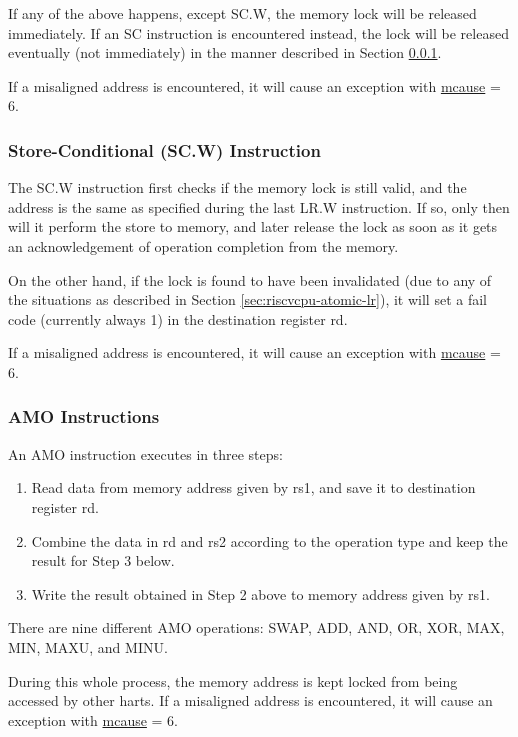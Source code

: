 \documentclass[main\_\_EN.tex]{subfiles}
\begin{document}
If any of the above happens, except SC.W, the memory lock will be released immediately. If an SC instruction is encountered instead, the lock will be released eventually (not immediately) in the manner described in Section \ref{sec:riscvcpu-atomic-sc}.

If a misaligned address is encountered, it will cause an exception with \hyperref[regdesc:MCAUSE]{mcause} = 6.

\subsubsection{Store-Conditional (SC.W) Instruction}
\label{sec:riscvcpu-atomic-sc}

The SC.W instruction first checks if the memory lock is still valid, and the address is the same as specified during the last LR.W instruction. If so, only then will it perform the store to memory, and later release the lock as soon as it gets an acknowledgement of operation completion from the memory.

On the other hand, if the lock is found to have been invalidated (due to any of the situations as described in Section \ref{sec:riscvcpu-atomic-lr}), it will set a fail code (currently always 1) in the destination register rd.

If a misaligned address is encountered, it will cause an exception with \hyperref[regdesc:MCAUSE]{mcause} = 6.

\subsubsection{AMO Instructions}
\label{sec:riscvcpu-atomic-amo}

An AMO instruction executes in three steps:

\begin{enumerate}
    \item Read data from memory address given by rs1, and save it to destination register rd.
    \item Combine the data in rd and rs2 according to the operation type and keep the result for Step 3 below.
    \item Write the result obtained in Step 2 above to memory address given by rs1.
\end{enumerate}

There are nine different AMO operations: SWAP, ADD, AND, OR, XOR, MAX, MIN, MAXU, and MINU.

During this whole process, the memory address is kept locked from being accessed by other harts. If a misaligned address is encountered, it will cause an exception with \hyperref[regdesc:MCAUSE]{mcause} = 6.
\end{document}
